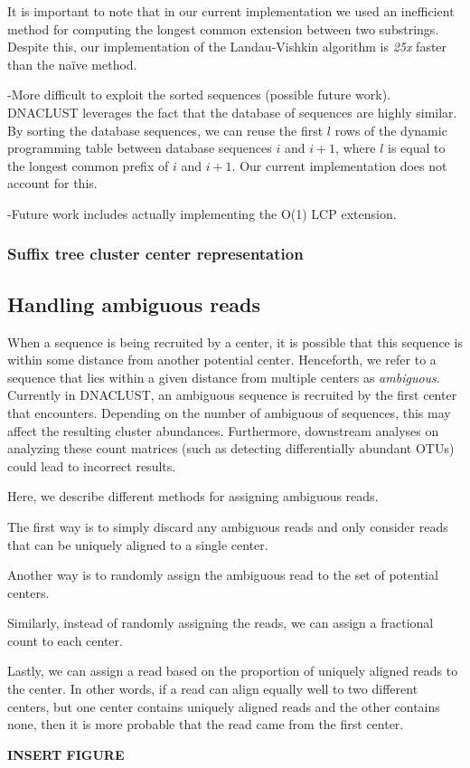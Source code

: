 It is important to note that in our current implementation we used an inefficient method for computing the longest common extension between two substrings.
Despite this, our implementation of the Landau-Vishkin algorithm is \emph{25x} faster than the na\"ive method.

-More difficult to exploit the sorted sequences (possible future work).
DNACLUST leverages the fact that the database of sequences are highly similar.
By sorting the database sequences, we can reuse the first $l$ rows of the dynamic programming table between database sequences $i$ and $i+1$, where $l$ is equal to the longest common prefix of $i$ and $i+1$.
Our current implementation does not account for this.



-Future work includes actually implementing the O(1) LCP extension.

\subsubsection{Suffix tree cluster center representation}

\subsection{Handling ambiguous reads}

When a sequence is being recruited by a center, it is possible that this sequence is within some distance from another potential center.
Henceforth, we refer to a sequence that lies within a given distance from multiple centers as \emph{ambiguous}.
Currently in DNACLUST, an ambiguous sequence is recruited by the first center that encounters.
Depending on the number of ambiguous of sequences, this may affect the resulting cluster abundances.
Furthermore, downstream analyses on analyzing these count matrices (such as detecting differentially abundant OTUs) could lead to incorrect results.

Here, we describe different methods for assigning ambiguous reads.

The first way is to simply discard any ambiguous reads and only consider reads that can be uniquely aligned to a single center.

Another way is to randomly assign the ambiguous read to the set of potential centers.

Similarly, instead of randomly assigning the reads, we can assign a fractional count to each center.

Lastly, we can assign a read based on the proportion of uniquely aligned reads to the center.  In other words, if a read can align equally well to two different centers, but one center contains uniquely aligned reads and the other contains none, then it is more probable that the read came from the first center.

{\bf INSERT FIGURE}
